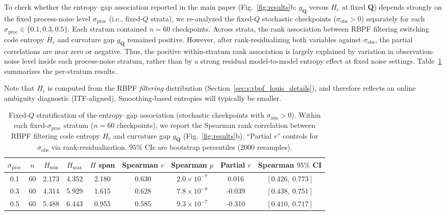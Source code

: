 \documentclass[twoside]{article}
\theoremstyle{plain}
\theoremstyle{definition}
\theoremstyle{remark}
\begin{document}
To check whether the entropy--gap association reported in the main paper (Fig.~\ref{fig:results}b; $g_{\bm Q}$ versus $H_c$ at fixed $\bm Q$) depends strongly on the fixed process-noise level $\sigma_{\mathrm{proc}}$ (i.e., fixed-$Q$ strata), we re-analyzed the fixed-$Q$ stochastic checkpoints ($\sigma_{\mathrm{obs}}>0$) separately for each $\sigma_{\mathrm{proc}}\in\{0.1,0.3,0.5\}$.
Each stratum contained $n=60$ checkpoints. Across strata, the rank association between RBPF filtering switching code entropy $H_c$ and curvature gap $g_{\bm Q}$ remained positive. However, after rank-residualizing both variables against $\sigma_{\mathrm{obs}}$, the partial correlations are near zero or negative. Thus, the positive within-stratum rank association is largely explained by variation in observation-noise level inside each process-noise stratum, rather than by a strong residual model-to-model entropy effect at fixed noise settings. Table~\ref{tab:s:fixedQ_strat} summarizes the per-stratum results.

Note that $H_c$ is computed from the RBPF \emph{filtering} distribution (Section~\ref{sec:s:rbpf_louis_details}), and therefore reflects an online ambiguity diagnostic (ITF-aligned). Smoothing-based entropies will typically be smaller.

\begin{table}[t]
\centering
\caption{Fixed-$Q$ stratification of the entropy--gap association (stochastic checkpoints with $\sigma_{\mathrm{obs}}>0$). Within each fixed-$\sigma_{\mathrm{proc}}$ stratum ($n=60$ checkpoints), we report the Spearman rank correlation between RBPF filtering code entropy $H_c$ and curvature gap $g_{\bm Q}$ (Fig.~\ref{fig:results}b). ``Partial $r$'' controls for $\sigma_{\mathrm{obs}}$ via rank-residualization. $95\%$ CIs are bootstrap percentiles (2000 resamples).}
\label{tab:s:fixedQ_strat}
{\small\setlength{\tabcolsep}{3pt}\renewcommand{\arraystretch}{1.1}
\begin{tabular}{c c c c c c c c c}
\hline
$\sigma_{\mathrm{proc}}$ & $n$ & $H_{\min}$ & $H_{\max}$ & $H$ span & Spearman $r$ & Spearman $p$ & Partial $r$ & Spearman $95\%$ CI \\
\hline
0.1 & 60 & 2.173 & 4.352 & 2.180 & 0.630 & $2.0\times 10^{-7}$ & 0.016 & $[0.426,\ 0.773]$ \\
0.3 & 60 & 4.314 & 5.929 & 1.615 & 0.628 & $7.8\times 10^{-8}$ & -0.039 & $[0.438,\ 0.751]$ \\
0.5 & 60 & 5.488 & 6.443 & 0.955 & 0.585 & $9.3\times 10^{-7}$ & -0.310 & $[0.410,\ 0.717]$ \\
\hline
\end{tabular}
}
\end{table}
\end{document}
